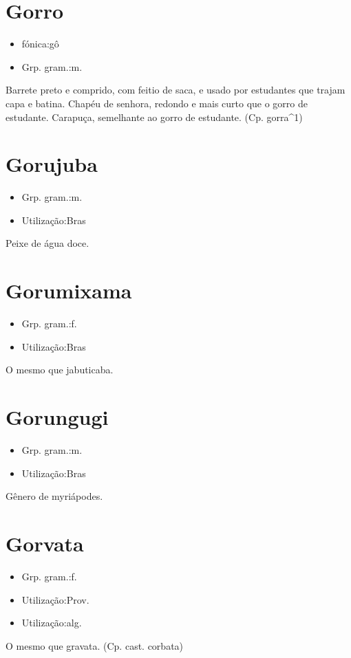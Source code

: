 \section{Gorro}
\begin{itemize}
\item {fónica:gô}
\end{itemize}
\begin{itemize}
\item {Grp. gram.:m.}
\end{itemize}
Barrete preto e comprido, com feitio de saca, e usado por estudantes que trajam capa e batina.
Chapéu de senhora, redondo e mais curto que o gorro de estudante.
Carapuça, semelhante ao gorro de estudante.
(Cp. \textunderscore gorra\textunderscore ^1)
\section{Gorujuba}
\begin{itemize}
\item {Grp. gram.:m.}
\end{itemize}
\begin{itemize}
\item {Utilização:Bras}
\end{itemize}
Peixe de água doce.
\section{Gorumixama}
\begin{itemize}
\item {Grp. gram.:f.}
\end{itemize}
\begin{itemize}
\item {Utilização:Bras}
\end{itemize}
O mesmo que \textunderscore jabuticaba\textunderscore .
\section{Gorungugi}
\begin{itemize}
\item {Grp. gram.:m.}
\end{itemize}
\begin{itemize}
\item {Utilização:Bras}
\end{itemize}
Gênero de myriápodes.
\section{Gorvata}
\begin{itemize}
\item {Grp. gram.:f.}
\end{itemize}
\begin{itemize}
\item {Utilização:Prov.}
\end{itemize}
\begin{itemize}
\item {Utilização:alg.}
\end{itemize}
O mesmo que \textunderscore gravata\textunderscore .
(Cp. cast. \textunderscore corbata\textunderscore )
